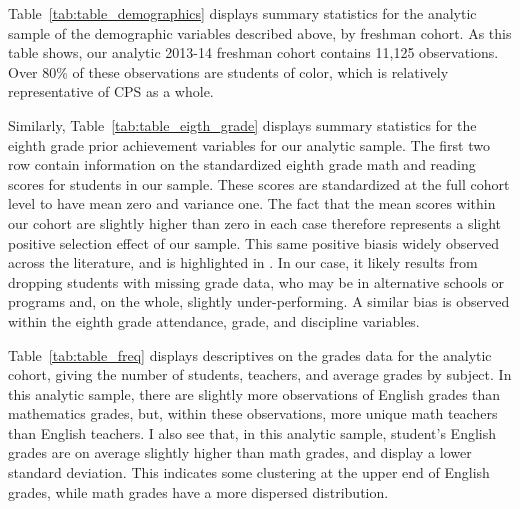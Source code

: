 \documentclass[../thesis_main.tex]{subfiles}
\begin{document}
Table~\ref{tab:table_demographics} displays summary statistics for the analytic sample of the demographic variables described above, by freshman cohort. As this table shows, our analytic 2013-14 freshman cohort contains 11,125 observations. Over 80\% of these observations are students of color, which is relatively representative of CPS as a whole.




Similarly, Table~\ref{tab:table_eigth_grade} displays summary statistics for the eighth grade prior achievement variables for our analytic sample. The first two row contain information on the standardized eighth grade math and reading scores for students in our sample. These scores are standardized at the full cohort level to have mean zero and variance one. The fact that the mean scores within our cohort are slightly higher than zero in each case therefore represents a slight positive selection effect of our sample. This same positive biasis widely observed across the literature, and is highlighted in \citet{gilraineMakingTeachingLast2020}. In our case, it likely results from dropping students with missing grade data, who may be in alternative schools or programs and, on the whole, slightly under-performing. A similar bias is observed within the eighth grade attendance, grade, and discipline variables.



Table~\ref{tab:table_freq} displays descriptives on the grades data for the analytic cohort, giving the number of students, teachers, and average grades by subject. In this analytic sample, there are slightly more observations of English grades than mathematics grades, but, within these observations, more unique math teachers than English teachers. I also see that, in this analytic sample, student's English grades are on average slightly higher than math grades, and display a lower standard deviation. This indicates some clustering at the upper end of English grades, while math grades have a more dispersed distribution.


\end{document}
